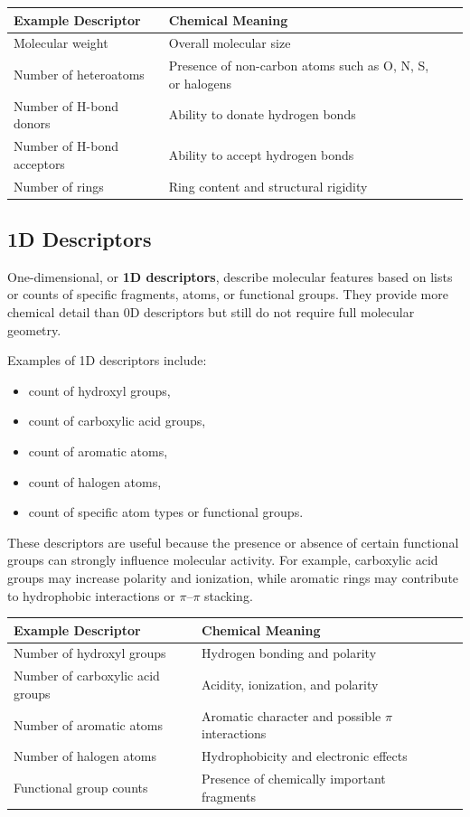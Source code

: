 \documentclass[11pt]{report}
\newenvironment{Important note}{\begin{quote}\color{red}\textbf{Important note:} }{\end{quote}}
\begin{document}
\begin{center}
\begin{tabular}{lll}
\toprule
\textbf{Example Descriptor} & \textbf{Chemical Meaning} \\
\midrule
Molecular weight & Overall molecular size \\
Number of heteroatoms & Presence of non-carbon atoms such as O, N, S, or halogens \\
Number of H-bond donors & Ability to donate hydrogen bonds \\
Number of H-bond acceptors & Ability to accept hydrogen bonds \\
Number of rings & Ring content and structural rigidity \\
\bottomrule
\end{tabular}
\end{center}

\subsection{1D Descriptors}

One-dimensional, or \textbf{1D descriptors}, describe molecular features based on lists or counts of specific fragments, atoms, or functional groups. They provide more chemical detail than 0D descriptors but still do not require full molecular geometry.

Examples of 1D descriptors include:

\begin{itemize}[leftmargin=*]
    \item count of hydroxyl groups,
    \item count of carboxylic acid groups,
    \item count of aromatic atoms,
    \item count of halogen atoms,
    \item count of specific atom types or functional groups.
\end{itemize}

These descriptors are useful because the presence or absence of certain functional groups can strongly influence molecular activity. For example, carboxylic acid groups may increase polarity and ionization, while aromatic rings may contribute to hydrophobic interactions or $\pi$--$\pi$ stacking.

\begin{center}
\begin{tabular}{lll}
\toprule
\textbf{Example Descriptor} & \textbf{Chemical Meaning} \\
\midrule
Number of hydroxyl groups & Hydrogen bonding and polarity \\
Number of carboxylic acid groups & Acidity, ionization, and polarity \\
Number of aromatic atoms & Aromatic character and possible $\pi$ interactions \\
Number of halogen atoms & Hydrophobicity and electronic effects \\
Functional group counts & Presence of chemically important fragments \\
\bottomrule
\end{tabular}
\end{center}
\end{document}
